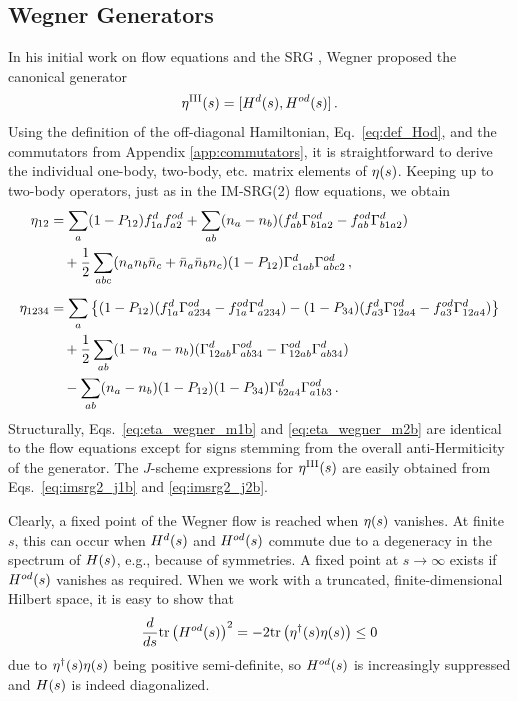 \subsection{\label{sec:generators_Wegner}Wegner Generators}
In his initial work on flow equations and the SRG \cite{Wegner:1994dk}, Wegner proposed the canonical generator 
\begin{equation}\label{eq:eta_wegner}
  \etaO^\text{III}(s) = \comm{\HO^d(s)}{\HO^{od}(s)}\,.
\end{equation}
Using the definition of the off-diagonal Hamiltonian, Eq.~\eqref{eq:def_Hod}, and the commutators from Appendix \ref{app:commutators}, it is straightforward to derive the individual one-body, two-body, etc. matrix elements of $\eta(s)$. Keeping up to two-body operators, just as in the IM-SRG(2) flow equations, we obtain
\begin{align}
  \eta_{12} &= 
  \sum_{a}(1-P_{12})f^d_{1a}f^{od}_{a2} +\sum_{ab}(n_a-n_b)(f^d_{ab}\Gamma^{od}_{b1a2}-f^{od}_{ab}\Gamma^d_{b1a2}) \notag\\ 
  &\quad +\frac{1}{2} \sum_{abc}(n_an_b\bar{n}_c+\bar{n}_a\bar{n}_bn_c) (1-P_{12})\Gamma^d_{c1ab}\Gamma^{od}_{abc2}
  \label{eq:eta_wegner_m1b}\,,\\[5pt]
  \eta_{1234}&= 
  \sum_{a}\left\{ 
    (1-P_{12})(f^d_{1a}\Gamma^{od}_{a234}-f^{od}_{1a}\Gamma^{d}_{a234} )
    -(1-P_{34})(f^{d}_{a3}\Gamma^{od}_{12a4}-f^{od}_{a3}\Gamma^d_{12a4} )
    \right\}\notag \\
  &\quad+ \frac{1}{2}\sum_{ab}(1-n_a-n_b)(\Gamma^d_{12ab}\Gamma^{od}_{ab34}-\Gamma^{od}_{12ab}\Gamma^d_{ab34})\notag\\
  &\quad-\sum_{ab}(n_a-n_b) (1-P_{12})(1-P_{34})\Gamma^d_{b2a4}\Gamma^{od}_{a1b3}
    \label{eq:eta_wegner_m2b}\,.
\end{align}
Structurally, Eqs.~\eqref{eq:eta_wegner_m1b} and \eqref{eq:eta_wegner_m2b} are identical to the flow equations except for signs stemming from the overall anti-Hermiticity of the generator. The $J$-scheme expressions for $\eta^\text{III}(s)$ are easily obtained from Eqs.~\eqref{eq:imsrg2_j1b} and \eqref{eq:imsrg2_j2b}.

Clearly, a fixed point of the Wegner flow is reached when $\eta(s)$ vanishes. At finite $s$, this can occur when $H^d(s)$ and $H^{od}(s)$ commute due to a degeneracy in the spectrum of $H(s)$, e.g., because of symmetries. A fixed point at $s\to\infty$ exists if $H^{od}(s)$ vanishes as required. When we work with a truncated, finite-dimensional Hilbert space, it is easy to show that \cite{Wegner:1994dk,Kehrein:2006kx}
\begin{equation} \label{eq:steepest_descent}
  \totd{}{s}\tr\left(\HO^{od}(s)\right)^2 = -2 \tr\left(\etaO^\dag(s)\etaO(s)\right)\leq 0
\end{equation}
due to $\eta^\dag(s)\eta(s)$ being positive semi-definite, so $H^{od}(s)$ is increasingly suppressed and $H(s)$ is indeed diagonalized. 

